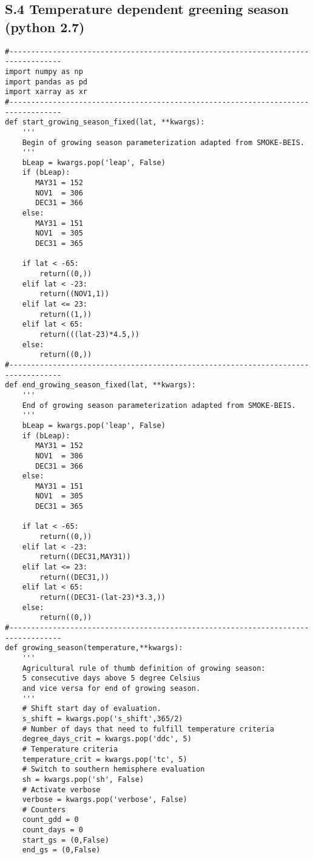 \documentclass[manuscript]{copernicus}
\begin{document}
\subsection*{S.4 Temperature dependent greening season (python 2.7)}
{\scriptsize
\begin{verbatim}
#----------------------------------------------------------------------------------
import numpy as np
import pandas as pd
import xarray as xr
#----------------------------------------------------------------------------------
def start_growing_season_fixed(lat, **kwargs):
    '''
    Begin of growing season parameterization adapted from SMOKE-BEIS.
    '''
    bLeap = kwargs.pop('leap', False)
    if (bLeap):
       MAY31 = 152
       NOV1  = 306
       DEC31 = 366
    else:
       MAY31 = 151
       NOV1  = 305
       DEC31 = 365
    
    if lat < -65:
        return((0,))
    elif lat < -23:
        return((NOV1,1))
    elif lat <= 23:
        return((1,))
    elif lat < 65:
        return(((lat-23)*4.5,))
    else:
        return((0,))
#----------------------------------------------------------------------------------
def end_growing_season_fixed(lat, **kwargs):
    '''
    End of growing season parameterization adapted from SMOKE-BEIS.
    '''
    bLeap = kwargs.pop('leap', False)
    if (bLeap):
       MAY31 = 152
       NOV1  = 306
       DEC31 = 366
    else:
       MAY31 = 151
       NOV1  = 305
       DEC31 = 365
       
    if lat < -65:
        return((0,))
    elif lat < -23:
        return((DEC31,MAY31))
    elif lat <= 23:
        return((DEC31,))
    elif lat < 65:
        return((DEC31-(lat-23)*3.3,))
    else:
        return((0,))
#----------------------------------------------------------------------------------
def growing_season(temperature,**kwargs):
    '''
    Agricultural rule of thumb definition of growing season:
    5 consecutive days above 5 degree Celsius 
    and vice versa for end of growing season.
    '''
    # Shift start day of evaluation.
    s_shift = kwargs.pop('s_shift',365/2)
    # Number of days that need to fulfill temperature criteria
    degree_days_crit = kwargs.pop('ddc', 5)
    # Temperature criteria
    temperature_crit = kwargs.pop('tc', 5)
    # Switch to southern hemisphere evaluation
    sh = kwargs.pop('sh', False)
    # Activate verbose
    verbose = kwargs.pop('verbose', False)
    # Counters
    count_gdd = 0
    count_days = 0
    start_gs = (0,False)
    end_gs = (0,False)
    

\end{verbatim}}
\end{document}
